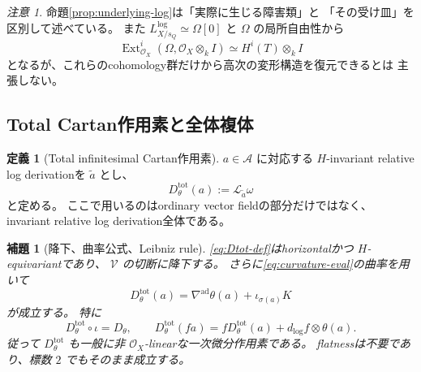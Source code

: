 \documentclass[uplatex,dvipdfmx,11pt]{jsarticle}
\numberwithin{equation}{section}
\theoremstyle{plain}
\newtheorem{lemma}[theorem]{補題}
\theoremstyle{definition}
\newtheorem{definition}[theorem]{定義}
\theoremstyle{remark}
\newtheorem{remark}[theorem]{注意}
\DeclareMathOperator{\Ext}{Ext}
\newcommand{\OO}{\mathcal O}
\newcommand{\shA}{\mathcal A}
\newcommand{\shV}{\mathcal V}
\newcommand{\Dtot}{D_\theta^{\mathrm{tot}}}
\newcommand{\nablaad}{\nabla^{\mathrm{ad}}}
\begin{document}
\begin{remark}
\label{rem:obspace-vs-obstruction}
命題\ref{prop:underlying-log}は「実際に生じる障害類」と
「その受け皿」を区別して述べている。
また \(L^{\log}_{X/s_Q}\simeq\Omega[0]\) と \(\Omega\) の局所自由性から
\[
\Ext^i_{\OO_X}(\Omega,\OO_X\otimes_kI)\simeq H^i(T)\otimes_kI
\]
となるが、これらのcohomology群だけから高次の変形構造を復元できるとは
主張しない。
\end{remark}

\subsection{Total Cartan作用素と全体複体}

\begin{definition}[Total infinitesimal Cartan作用素]
\label{def:total-operator}
\(a\in\shA\) に対応する \(H\)-invariant relative log derivationを
\(\widetilde a\) とし、
\begin{equation}
\label{eq:Dtot-def}
\Dtot(a):=\mathcal L_{\widetilde a}\omega
\end{equation}
と定める。
ここで用いるのはordinary vector fieldの部分だけではなく、
invariant relative log derivation全体である。
\end{definition}

\begin{lemma}[降下、曲率公式、Leibniz rule]
\label{lem:total-operator}
\eqref{eq:Dtot-def}はhorizontalかつ \(H\)-equivariantであり、
\(\shV\) の切断に降下する。
さらに\eqref{eq:curvature-eval}の曲率を用いて
\begin{equation}
\label{eq:curvature-formula}
\Dtot(a)=\nablaad\theta(a)+\iota_{\sigma(a)}K
\end{equation}
が成立する。
特に
\begin{equation}
\label{eq:Dtot-vertical}
\Dtot\circ\iota=D_\theta,
\qquad
\Dtot(fa)=f\Dtot(a)+d_{\log}f\otimes\theta(a).
\end{equation}
従って \(\Dtot\) も一般に非 \(\OO_X\)-linearな一次微分作用素である。
flatnessは不要であり、標数 \(2\) でもそのまま成立する。
\end{lemma}
\end{document}
